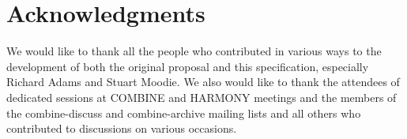 
\section{Acknowledgments}
We would like to thank all the people who contributed in various ways to the development of both the original proposal and this specification, especially Richard Adams and Stuart Moodie. 
We also would like to thank the attendees of dedicated sessions at COMBINE and HARMONY meetings and the members of the \textsf{combine-discuss} and \textsf{combine-archive} mailing lists and all others who contributed to 
discussions on various occasions. 




